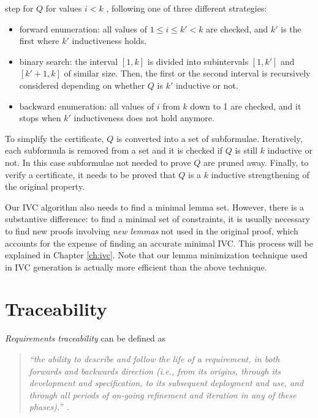 step for $Q$ for values $i < k$ , following one
of three different strategies:
\begin{itemize}
  \item forward enumeration: all values of $1 \le i \leq k' < k$  are checked, and $k'$ is the first where $k'$ inductiveness holds.
  \item binary search: the interval $[1 , k ]$ is divided into 
  subintervals $[1 , k' ]$ and
$[ k' + 1 , k ]$ of similar size. Then, the first or
the second interval is recursively considered depending on whether $Q$ is $k'$ inductive
or not.
  \item backward enumeration: all values of $i$ from $k$ down to 1 are checked, and it stops
when $k'$ inductiveness does not hold anymore.
\end{itemize}

To simplify the certificate, $Q$ is converted into a set of subformulae.  
Iteratively, each subformula is removed from a set and it is checked if $Q$ is still $k$ inductive or not. In this case subformulae not needed to prove
$Q$ are pruned away. Finally, to verify a certificate, it needs to be proved that $Q$ is
a $k$ inductive strengthening of the original property.

Our IVC algorithm also needs to find a minimal lemma set.  However, there is a substantive difference: to find a minimal set of constraints, it is usually necessary to find new proofs involving {\em new lemmas} not used in the original proof, which accounts for the expense of finding an accurate minimal IVC. This process will be explained in Chapter \ref{ch:ivc}. Note that our lemma minimization technique used in IVC generation is actually more efficient than the above technique.

\section{Traceability}
\emph{Requirements traceability} can be defined as

\begin{quotation}
\textit{``the ability to describe and follow the life of a requirement, in both forwards and backwards direction (i.e., from its origins, through its development and specification, to its subsequent deployment and use, and through all periods of on-going refinement and iteration in any of these phases).''}~\cite{gotel}.
\end{quotation}

